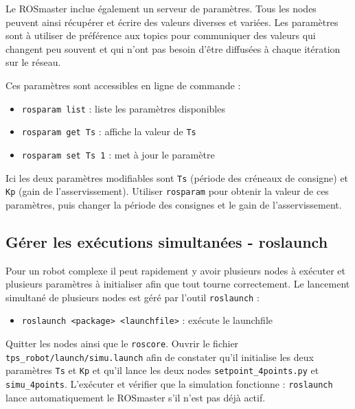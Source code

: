 \documentclass[12pt,a4paper]{article}
\begin{document}
Le ROSmaster inclue également un serveur de paramètres. Tous les nodes peuvent ainsi récupérer et écrire des valeurs diverses et variées.
Les paramètres sont à utiliser de préférence aux topics pour communiquer des valeurs qui changent peu souvent et qui n'ont pas besoin d'être diffusées à chaque itération sur le réseau.

Ces paramètres sont accessibles en ligne de commande :
\begin{itemize}
\item \texttt{rosparam list} : liste les paramètres disponibles
\item \texttt{rosparam get Ts} : affiche la valeur de \texttt{Ts}
\item \texttt{rosparam set Ts 1} : met à jour le paramètre
\end{itemize}
Ici les deux paramètres modifiables sont \texttt{Ts} (période des créneaux de consigne) et \texttt{Kp} (gain de l'asservissement).
Utiliser \texttt{rosparam} pour obtenir la valeur de ces paramètres, puis changer la période des consignes et le gain de l'asservissement.

\subsection{Gérer les exécutions simultanées - roslaunch}

Pour un robot complexe il peut rapidement y avoir plusieurs nodes à exécuter et plusieurs paramètres à initialiser afin que tout tourne correctement. Le lancement simultané de plusieurs nodes est géré par l'outil \texttt{roslaunch} :
\begin{itemize}
\item \texttt{roslaunch <package> <launchfile>} : exécute le launchfile
\end{itemize}
Quitter les nodes ainsi que le \texttt{roscore}.
Ouvrir le fichier \texttt{tps\_robot/launch/simu.launch} afin de constater qu'il initialise les deux paramètres \texttt{Ts} et \texttt{Kp} et qu'il lance les deux nodes \texttt{setpoint\_4points.py} et \texttt{simu\_4points}.
L'exécuter et vérifier que la simulation fonctionne : \texttt{roslaunch} lance automatiquement le ROSmaster s'il n'est pas déjà actif.
\end{document}
